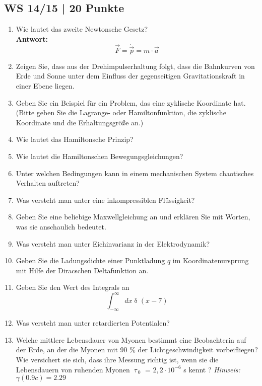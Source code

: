 \subsection{WS 14/15 | 20 Punkte} %
\begin{enumerate}
    \item Wie lautet das zweite Newtonsche Gesetz?\\
    \textbf{Antwort:}\\
    \begin{equation*}
        \vec{F} = \dot{\vec{p}} = m \cdot \vec{a}
    \end{equation*}
    \item Zeigen Sie, dass aus der Drehimpulserhaltung folgt, dass die Bahnkurven von Erde und Sonne unter dem Einfluss der gegenseitigen Gravitationskraft in einer Ebene liegen.
    \item Geben Sie ein Beispiel für ein Problem, das eine zyklische Koordinate hat. (Bitte geben Sie die Lagrange- oder Hamiltonfunktion, die zyklische Koordinate und die Erhaltungsgröße an.)
    \item Wie lautet das Hamiltonsche Prinzip?
    \item Wie lautet die Hamiltonschen Bewegungsgleichungen?
    \item Unter welchen Bedingungen kann in einem mechanischen System chaotisches Verhalten auftreten?
    \item Was versteht man unter eine inkompressiblen Flüssigkeit?
    \item Geben Sie eine beliebige Maxwellgleichung an und erklären Sie mit Worten, was sie anschaulich bedeutet.
    \item Was versteht man unter Eichinvarianz in der Elektrodynamik?
    \item Geben Sie die Ladungsdichte einer Punktladung $q$ im Koordinatenursprung mit Hilfe der Diracschen Deltafunktion an.
    \item Geben Sie den Wert des Integrals an
    \begin{equation*}
        \int_{-\infty}^{\infty} dx \updelta (x-7)
    \end{equation*}
    \item Was versteht man unter retardierten Potentialen?
    \item Welche mittlere Lebensdauer von Myonen bestimmt eine Beobachterin auf der Erde, an der die Myonen mit 90 \% der Lichtgeschwindigkeit vorbeifliegen? Wie versichert sie sich, dass ihre Messung richtig ist, wenn sie die Lebensdauern von ruhenden Myonen $\uptau_0$ = $2,2 \cdot 10^{-6}$ s kennt ? \textit{Hinweis: $\gamma(0.9c) = 2.29$}
\end{enumerate}




